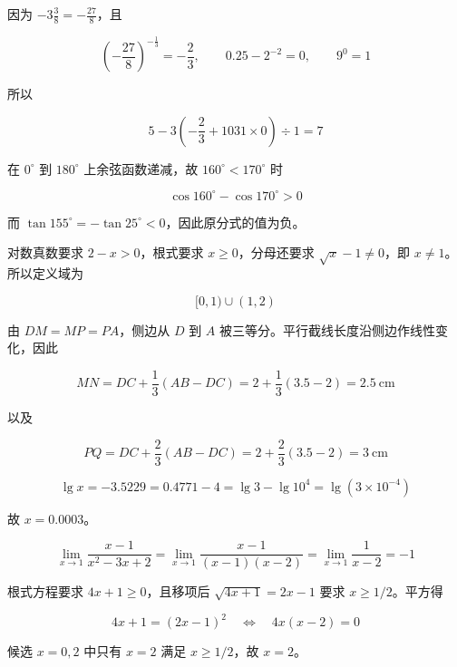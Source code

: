 \begin{answer}

因为 $-3\frac38=-\frac{27}{8}$，且

\nopagebreak[4]
\[
\left(-\frac{27}{8}\right)^{-\frac13}=-\frac23,
\qquad
0.25-2^{-2}=0,
\qquad
9^0=1
\]

所以

\nopagebreak[4]
\[
5-3\left(-\frac23+1031\times0\right)\div1=7
\]


在 $0^\circ$ 到 $180^\circ$ 上余弦函数递减，故 $160^\circ<170^\circ$ 时

\nopagebreak[4]
\[
\cos160^\circ-\cos170^\circ>0
\]

而 $\tan155^\circ=-\tan25^\circ<0$，因此原分式的值为负。


对数真数要求 $2-x>0$，根式要求 $x\ge0$，分母还要求 $\sqrt{x}-1\ne0$，即 $x\ne1$。所以定义域为

\nopagebreak[4]
\[
[0,1)\cup(1,2)
\]


由 $DM=MP=PA$，侧边从 $D$ 到 $A$ 被三等分。平行截线长度沿侧边作线性变化，因此

\nopagebreak[4]
\[
MN=DC+\frac13(AB-DC)=2+\frac13(3.5-2)=2.5\ \mathrm{cm}
\]

以及

\nopagebreak[4]
\[
PQ=DC+\frac23(AB-DC)=2+\frac23(3.5-2)=3\ \mathrm{cm}
\]


\nopagebreak[4]
\[
\lg x=-3.5229=0.4771-4=\lg3-\lg10^4=\lg(3\times10^{-4})
\]

故 $x=0.0003$。


\nopagebreak[4]
\[
\lim_{x\to1}\frac{x-1}{x^2-3x+2}
=\lim_{x\to1}\frac{x-1}{(x-1)(x-2)}
=\lim_{x\to1}\frac1{x-2}=-1
\]


根式方程要求 $4x+1\ge0$，且移项后 $\sqrt{4x+1}=2x-1$ 要求 $x\ge1/2$。平方得

\nopagebreak[4]
\[
4x+1=(2x-1)^2
\quad\Longleftrightarrow\quad
4x(x-2)=0
\]

候选 $x=0,2$ 中只有 $x=2$ 满足 $x\ge1/2$，故 $x=2$。



\end{answer}
